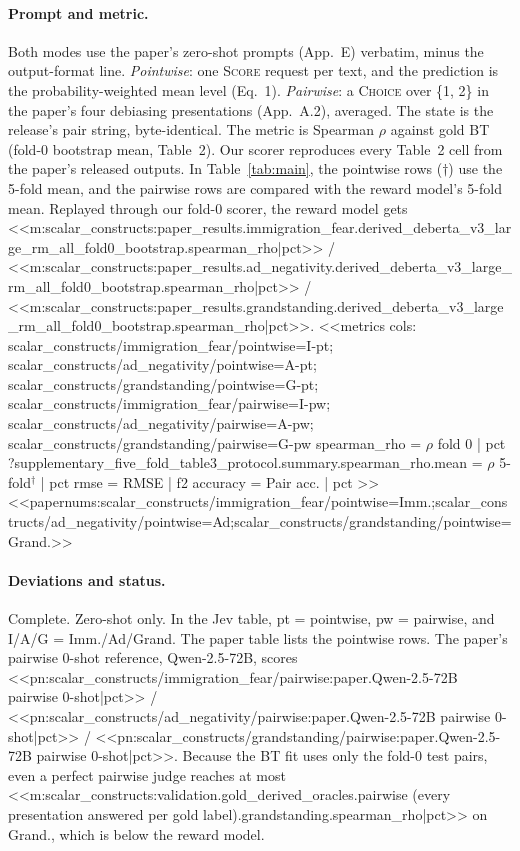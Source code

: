 \paragraph{Prompt and metric.} Both modes use the paper's zero-shot prompts (App.~E) verbatim, minus the
output-format line. \emph{Pointwise}: one \textsc{Score} request per text, and the prediction is the
probability-weighted mean level (Eq.~1). \emph{Pairwise}: a \textsc{Choice} over \{1, 2\} in the paper's four
debiasing presentations (App.~A.2), averaged. The state is the release's pair string, byte-identical.
The metric is Spearman $\rho$ against gold BT (fold-0 bootstrap mean, Table~2). Our scorer reproduces every
Table~2 cell from the paper's released outputs. In Table~\ref{tab:main}, the pointwise rows ($\dagger$) use the
5-fold mean, and the pairwise rows are compared with the reward model's 5-fold mean. Replayed through our
fold-0 scorer, the reward model gets
<<m:scalar_constructs:paper_results.immigration_fear.derived_deberta_v3_large_rm_all_fold0_bootstrap.spearman_rho|pct>> /
<<m:scalar_constructs:paper_results.ad_negativity.derived_deberta_v3_large_rm_all_fold0_bootstrap.spearman_rho|pct>> /
<<m:scalar_constructs:paper_results.grandstanding.derived_deberta_v3_large_rm_all_fold0_bootstrap.spearman_rho|pct>>.
<<metrics
cols: scalar_constructs/immigration_fear/pointwise=I-pt; scalar_constructs/ad_negativity/pointwise=A-pt; scalar_constructs/grandstanding/pointwise=G-pt; scalar_constructs/immigration_fear/pairwise=I-pw; scalar_constructs/ad_negativity/pairwise=A-pw; scalar_constructs/grandstanding/pairwise=G-pw
spearman_rho = $\rho$ fold 0 | pct
?supplementary_five_fold_table3_protocol.summary.spearman_rho.mean = $\rho$ 5-fold$^\dagger$ | pct
rmse = RMSE | f2
accuracy = Pair acc. | pct
>>
<<papernums:scalar_constructs/immigration_fear/pointwise=Imm.;scalar_constructs/ad_negativity/pointwise=Ad;scalar_constructs/grandstanding/pointwise=Grand.>>

\paragraph{Deviations and status.} Complete. Zero-shot only. In the Jev table, pt = pointwise, pw = pairwise,
and I/A/G = Imm./Ad/Grand. The paper table lists the pointwise rows. The paper's pairwise 0-shot reference,
Qwen-2.5-72B, scores
<<pn:scalar_constructs/immigration_fear/pairwise:paper.Qwen-2.5-72B pairwise 0-shot|pct>> /
<<pn:scalar_constructs/ad_negativity/pairwise:paper.Qwen-2.5-72B pairwise 0-shot|pct>> /
<<pn:scalar_constructs/grandstanding/pairwise:paper.Qwen-2.5-72B pairwise 0-shot|pct>>. Because the BT fit uses
only the fold-0 test pairs, even a perfect pairwise judge reaches at most
<<m:scalar_constructs:validation.gold_derived_oracles.pairwise (every presentation answered per gold label).grandstanding.spearman_rho|pct>>
on Grand., which is below the reward model.
